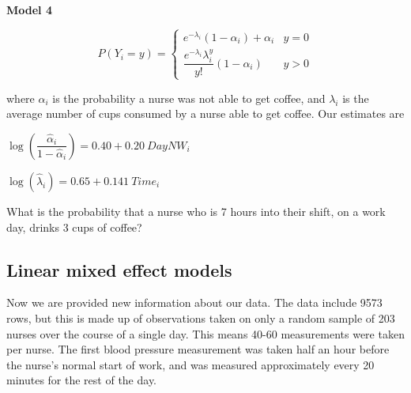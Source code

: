 \documentclass[11pt]{article}
\begin{document}
\textbf{Model 4} 

$$P(Y_i = y) = \begin{cases} e^{-\lambda_i}(1 - \alpha_i) + \alpha_i & y = 0 \\ \dfrac{e^{-\lambda_i} \lambda_i^y}{y!}(1 - \alpha_i) & y > 0 \end{cases}$$

where $\alpha_i$ is the probability a nurse was not able to get coffee, and $\lambda_i$ is the average number of cups consumed by a nurse able to get coffee. Our estimates are

$\log \left( \dfrac{\widehat{\alpha}_i}{1 - \widehat{\alpha}_i} \right) = 0.40 + 0.20 \ DayNW_i$

$\log(\widehat{\lambda}_i) = 0.65 + 0.141 \ Time_i$

What is the probability that a nurse who is 7 hours into their shift, on a work day, drinks 3 cups of coffee? 


\pagebreak

\subsection{Linear mixed effect models}

Now we are provided new information about our data. The data include 9573 rows, but this is made up of observations taken on only a random sample of 203 nurses over the course of a single day. This means 40-60 measurements were taken per nurse. The first blood pressure measurement was taken half an hour before the nurse's normal start of work, and was measured approximately every 20 minutes for the rest of the day.
\end{document}
